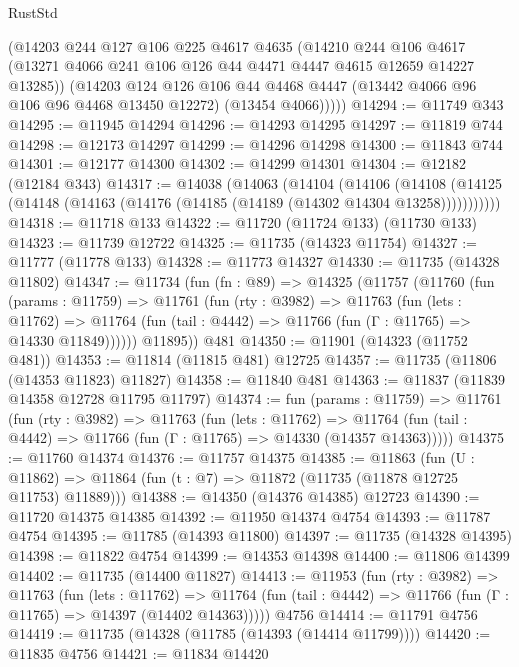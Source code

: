 \begin{lexlean}{RustStd}
\begin{coremodule}
{\begin{coremodule}
{{{{{{{{{{{{{{{{{{{{{{{{{{{{{{{{{{{{{{{{{{{{{{{{{{{{{{{{{{{{{{{{{{{{        (@14203
          @244
          @127
          @106
          @225
          @4617
          @4635
          (@14210
            @244
            @106
            @4617
            (@13271 @4066 @241 @106 @126 @44 @4471 @4447 @4615 @12659 @14227 @13285))
          (@14203
            @124
            @126
            @106
            @44
            @4468
            @4447
            (@13442 @4066 @96 @106 @96 @4468 @13450 @12272)
            (@13454 @4066)))))
@14294 := @11749 @343
@14295 := @11945 @14294
@14296 := @14293 @14295
@14297 := @11819 @744
@14298 := @12173 @14297
@14299 := @14296 @14298
@14300 := @11843 @744
@14301 := @12177 @14300
@14302 := @14299 @14301
@14304 := @12182 (@12184 @343)
@14317 := @14038
    (@14063
      (@14104
        (@14106
          (@14108 (@14125 (@14148 (@14163 (@14176 (@14185 (@14189 (@14302 @14304 @13258)))))))))))
@14318 := @11718 @133
@14322 := @11720 (@11724 @133) (@11730 @133)
@14323 := @11739 @12722
@14325 := @11735 (@14323 @11754)
@14327 := @11777 (@11778 @133)
@14328 := @11773 @14327
@14330 := @11735 (@14328 @11802)
@14347 := @11734
    (fun (fn : @89) =>
    @14325
      (@11757
        (@11760
          (fun (params : @11759) =>
          @11761
            (fun (rty : @3982) =>
            @11763
              (fun (lets : @11762) =>
              @11764 (fun (tail : @4442) => @11766 (fun (Γ : @11765) => @14330 @11849))))))
        @11895))
    @481
@14350 := @11901 (@14323 (@11752 @481))
@14353 := @11814 (@11815 @481) @12725
@14357 := @11735 (@11806 (@14353 @11823) @11827)
@14358 := @11840 @481
@14363 := @11837 (@11839 @14358 @12728 @11795 @11797)
@14374 := fun (params : @11759) =>
  @11761
    (fun (rty : @3982) =>
    @11763
      (fun (lets : @11762) =>
      @11764 (fun (tail : @4442) => @11766 (fun (Γ : @11765) => @14330 (@14357 @14363)))))
@14375 := @11760 @14374
@14376 := @11757 @14375
@14385 := @11863
    (fun (U : @11862) => @11864 (fun (t : @7) => @11872 (@11735 (@11878 @12725 @11753) @11889)))
@14388 := @14350 (@14376 @14385) @12723
@14390 := @11720 @14375 @14385
@14392 := @11950 @14374 @4754
@14393 := @11787 @4754
@14395 := @11785 (@14393 @11800)
@14397 := @11735 (@14328 @14395)
@14398 := @11822 @4754
@14399 := @14353 @14398
@14400 := @11806 @14399
@14402 := @11735 (@14400 @11827)
@14413 := @11953
    (fun (rty : @3982) =>
    @11763
      (fun (lets : @11762) =>
      @11764 (fun (tail : @4442) => @11766 (fun (Γ : @11765) => @14397 (@14402 @14363)))))
    @4756
@14414 := @11791 @4756
@14419 := @11735 (@14328 (@11785 (@14393 (@14414 @11799))))
@14420 := @11835 @4756
@14421 := @11834 @14420
}}}}}}}}}}}}}}}}}}}}}}}}}}}}}}}}}}}}}}}}}}}}}}}}}}}}}}}}}}}}}}}}}}}}
\end{coremodule}}
\end{coremodule}
\end{lexlean}
